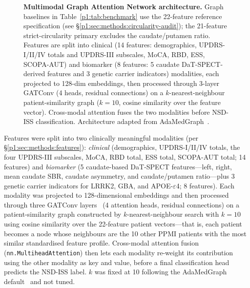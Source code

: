 \begin{figure}[!t]
\caption{\textbf{Multimodal Graph Attention Network architecture.} Graph baselines in Table~\ref{p1:tab:benchmark} use the 22-feature reference specification (see \S\ref{p1:sec:methods:circularity-audit}); the 21-feature strict-circularity primary excludes the caudate/putamen ratio. Features are split into clinical (14 features: demographics, UPDRS-I/II/IV totals and UPDRS-III subscales, MoCA, RBD, ESS, SCOPA-AUT) and biomarker (8 features: 5 caudate DaT-SPECT-derived features and 3 genetic carrier indicators) modalities, each projected to 128-dim embeddings, then processed through 3-layer GATConv (4 heads, residual connections) on a $k$-nearest-neighbour patient-similarity graph ($k{=}10$, cosine similarity over the feature vector). Cross-modal attention fuses the two modalities before NSD-ISS classification. Architecture adapted from AdaMedGraph~\cite{adamedgraph}.}
\label{p1:fig:architecture}
\end{figure}

Features were split into two clinically meaningful modalities (per \S\ref{p1:sec:methods:features}): \textit{clinical} (demographics, UPDRS-I/II/IV totals, the four UPDRS-III subscales, MoCA, RBD total, ESS total, SCOPA-AUT total; 14 features) and \textit{biomarker} (5 caudate-based DaT-SPECT features---left, right, mean caudate SBR, caudate asymmetry, and caudate/putamen ratio---plus 3 genetic carrier indicators for LRRK2, GBA, and APOE-$\varepsilon$4; 8 features). Each modality was projected to 128-dimensional embeddings and then processed through three GATConv layers~\cite{velickovic2018gat} (4 attention heads, residual connections) on a patient-similarity graph constructed by $k$-nearest-neighbour search with $k{=}10$ using cosine similarity over the 22-feature patient vectors---that is, each patient becomes a node whose neighbours are the 10 other PPMI patients with the most similar standardised feature profile. Cross-modal attention fusion (\texttt{nn.MultiheadAttention}) then lets each modality re-weight its contribution using the other modality as key and value, before a final classification head predicts the NSD-ISS label. $k$ was fixed at 10 following the AdaMedGraph default~\cite{adamedgraph} and not tuned.

